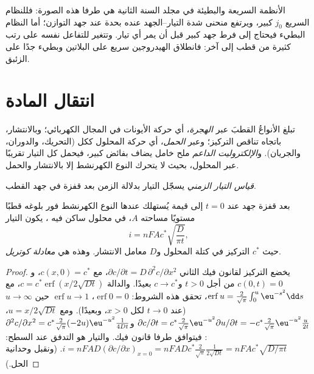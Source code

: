 الأنظمة السريعة والبطيئة في مجلد السنة الثانية هي طرفا هذه
الصورة: فللنظام السريع $j_0$ كبير، ويرتفع منحنى شدة التيار--الجهد عنده
بحدة عند جهد التوازن؛ أما النظام البطيء فيحتاج إلى فرط جهد كبير
قبل أن يمر أي تيار. وتتغير  للتفاعل نفسه
على رتب كثيرة من قطب إلى آخر:
فانطلاق الهيدروجين سريع على البلاتين وبطيء جدًا على الزئبق.

\section{انتقال المادة}

\begin{definition}\label{def:b3:electrode-kinetics:transport}
تبلغ الأنواعُ القطبَ عبر \emph{الهجرة}، أي حركة الأيونات
في المجال الكهربائي؛ وبالانتشار، باتجاه تناقص التركيز؛
وعبر \emph{الحمل}، أي حركة المحلول ككل
(التحريك، والدوران، والجريان). و\emph{الإلكتروليت الداعم}
ملح خامل يضاف بفائض كبير، فيحمل كل التيار تقريبًا
عبر المحلول، بحيث لا يتحرك النوع الكهرنشط إلا
بالانتشار والحمل.
\end{definition}

\begin{definition}\label{def:b3:electrode-kinetics:chronoamperometry}
\emph{قياس التيار الزمني} يسجّل التيار بدلالة الزمن
بعد قفزة في جهد القطب.
\end{definition}

\begin{theorem}\label{thm:b3:electrode-kinetics:cottrell}
بعد قفزة جهد عند $t = 0$ إلى قيمة يُستهلك عندها النوع الكهرنشط
فور بلوغه قطبًا مستويًا مساحته $A$، في محلول ساكن
فيه ، يكون التيار
\[
  i = nFAc^*\sqrt{\frac{D}{\pi t}},
\]
حيث $c^*$ التركيز في كتلة المحلول و$D$ معامل الانتشار. وهذه هي
\emph{معادلة كوتريل}.
\end{theorem}

\begin{proof}
يخضع التركيز لقانون فيك الثاني $\partial c/\partial t = D\,\partial^2c/\partial x^2$، مع $c(x, 0) = c^*$،
و$c(0, t) = 0$ من أجل $t > 0$ و$c \to c^*$ بعيدًا. والدالة $c = c^*\operatorname{erf}(x/2\sqrt{Dt})$، مع
$\operatorname{erf}u = \frac{2}{\sqrt\pi}\int_0^u\eu^{-s^2}\dd s$، تحقق هذه الشروط: $\operatorname{erf}0 = 0$، $\operatorname{erf}u \to 1$ حين $u \to \infty$
(عند $t \to 0$ لكل $x > 0$، وبعيدًا). ومع $u = x/2\sqrt{Dt}$،
$\partial c/\partial t = c^*\frac{2}{\sqrt\pi}\eu^{-u^2}\partial u/\partial t = -c^*\frac{2}{\sqrt\pi}\eu^{-u^2}\frac{u}{2t}$ و$\partial^2c/\partial x^2 = c^*\frac{2}{\sqrt\pi}(-2u)\eu^{-u^2}\frac{1}{4Dt}$: فيتوافق
طرفا قانون فيك. والتيار هو التدفق عند السطح: $i =
nFAD(\partial c/\partial x)_{x = 0} = nFADc^*\frac{2}{\sqrt\pi}\frac{1}{2\sqrt{Dt}} = nFAc^*\sqrt{D/\pi t}$. (ونقبل وحدانية
الحل.)
\end{proof}

